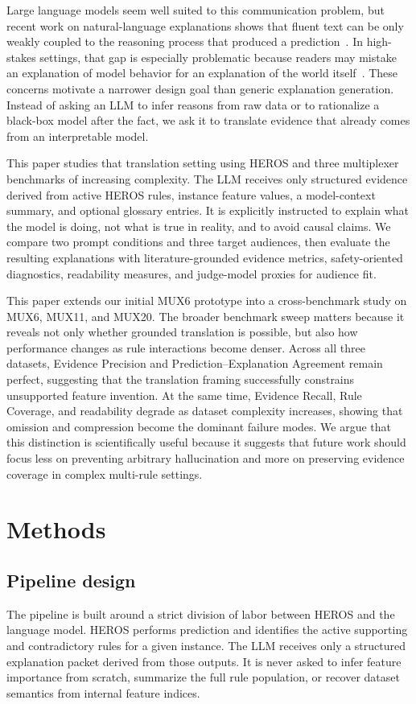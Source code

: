 \documentclass[sigconf,nonacm]{acmart}
\begin{document}
Large language models seem well suited to this communication problem, but recent work on natural-language explanations shows that fluent text can be only weakly coupled to the reasoning process that produced a prediction~\cite{atanasova2023faithfulness,madsen2024self,parcalabescu2024measuring,lyu2024survey}. In high-stakes settings, that gap is especially problematic because readers may mistake an explanation of model behavior for an explanation of the world itself~\cite{carriero2025describe}. These concerns motivate a narrower design goal than generic explanation generation. Instead of asking an LLM to infer reasons from raw data or to rationalize a black-box model after the fact, we ask it to translate evidence that already comes from an interpretable model.

This paper studies that translation setting using HEROS and three multiplexer benchmarks of increasing complexity. The LLM receives only structured evidence derived from active HEROS rules, instance feature values, a model-context summary, and optional glossary entries. It is explicitly instructed to explain what the model is doing, not what is true in reality, and to avoid causal claims. We compare two prompt conditions and three target audiences, then evaluate the resulting explanations with literature-grounded evidence metrics, safety-oriented diagnostics, readability measures, and judge-model proxies for audience fit.

This paper extends our initial MUX6 prototype into a cross-benchmark study on MUX6, MUX11, and MUX20. The broader benchmark sweep matters because it reveals not only whether grounded translation is possible, but also how performance changes as rule interactions become denser. Across all three datasets, Evidence Precision and Prediction--Explanation Agreement remain perfect, suggesting that the translation framing successfully constrains unsupported feature invention. At the same time, Evidence Recall, Rule Coverage, and readability degrade as dataset complexity increases, showing that omission and compression become the dominant failure modes. We argue that this distinction is scientifically useful because it suggests that future work should focus less on preventing arbitrary hallucination and more on preserving evidence coverage in complex multi-rule settings.

\section{Methods}
\subsection{Pipeline design}
The pipeline is built around a strict division of labor between HEROS and the language model. HEROS performs prediction and identifies the active supporting and contradictory rules for a given instance. The LLM receives only a structured explanation packet derived from those outputs. It is never asked to infer feature importance from scratch, summarize the full rule population, or recover dataset semantics from internal feature indices.
\end{document}
